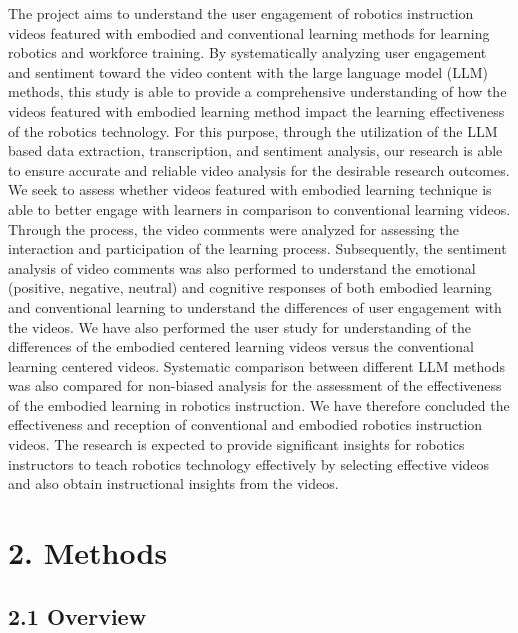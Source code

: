 \documentclass[12pt]{article}
\begin{document}
\noindent The project aims to understand the user engagement of robotics instruction videos featured with embodied and conventional learning methods for learning robotics and workforce training. By systematically analyzing user engagement and sentiment toward the video content with the large language model (LLM) methods, this study is able to provide a comprehensive understanding of how the videos featured with embodied learning method impact the learning effectiveness of the robotics technology. For this purpose, through the utilization of the LLM based data extraction, transcription, and sentiment analysis, our research is able to ensure accurate and reliable video analysis for the desirable research outcomes. We seek to assess whether videos featured with embodied learning technique is able to better engage with learners in comparison to conventional learning videos. Through the process, the video comments were analyzed for assessing the interaction and participation of the learning process. Subsequently, the sentiment analysis of video comments was also performed to understand the emotional (positive, negative, neutral) and cognitive responses of both embodied learning and conventional learning to understand the differences of user engagement with the videos.  We have also performed the user study for understanding of the differences of the embodied centered learning videos versus the conventional learning centered videos. Systematic comparison between different LLM methods was also compared for non-biased analysis for the assessment of the effectiveness of the embodied learning in robotics instruction.  We have therefore concluded the effectiveness and reception of conventional and embodied robotics instruction videos. The research is expected to provide significant insights for robotics instructors to teach robotics technology effectively by selecting effective videos and also obtain instructional insights from the videos. 

\section*{2. Methods}

\subsection*{2.1 Overview}
\end{document}
